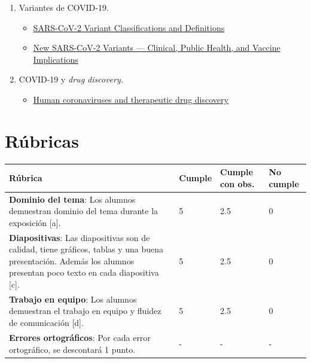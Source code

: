 \documentclass{article}
\begin{document}
\begin{enumerate}
		\item Variantes de COVID-19.
		\begin{itemize}
			\item \href{https://www.cdc.gov/coronavirus/2019-ncov/variants/variant-info.html}{SARS-CoV-2 Variant Classifications and Definitions}
			\item \href{https://www.nejm.org/doi/full/10.1056/NEJMc2100362}{New SARS-CoV-2 Variants — Clinical, Public Health, and Vaccine Implications}
		\end{itemize}
	
		\item COVID-19 y \textit{drug discovery.}
		\begin{itemize}
			\item \href{https://idpjournal.biomedcentral.com/articles/10.1186/s40249-021-00812-9}{Human coronaviruses and therapeutic drug discovery}
		\end{itemize}
		
	\end{enumerate}


	\clearpage
	\section{Rúbricas}
	
	\begin{table}[hbt!]
		\setlength{\tabcolsep}{0.5em} %
		{\renewcommand{\arraystretch}{1.5}%
			\begin{tabular}{|p{5cm}|x{3cm}|x{3cm}|x{3cm}|}
				\hline 
				\textbf{Rúbrica} & \textbf{Cumple}  & \textbf{Cumple con obs.}  & \textbf{No cumple} \\
				\hline 
				
				\textbf{Dominio del tema}: Los alumnos demuestran dominio del tema durante la exposición [a].  & 5 & 2.5 & 0   \\ \hline

				\textbf{Diapositivas}: Las diapositivas son de calidad, tiene gráficos, tablas y una buena presentación. Además los alumnos presentan poco texto en cada diapositiva [c].  & 5 & 2.5 & 0   \\ \hline
				
				\textbf{Trabajo en equipo}: Los alumnos demuestran el trabajo en equipo y fluidez de comunicación [d]. & 5 & 2.5 & 0   \\ 			\hline 
				
				\textbf{Errores ortográficos}: Por cada error ortográfico, se descontará 1 punto.  & - & - & -   \\ \hline
				
			\end{tabular}
		}
	\end{table}

	
	
\end{document}
